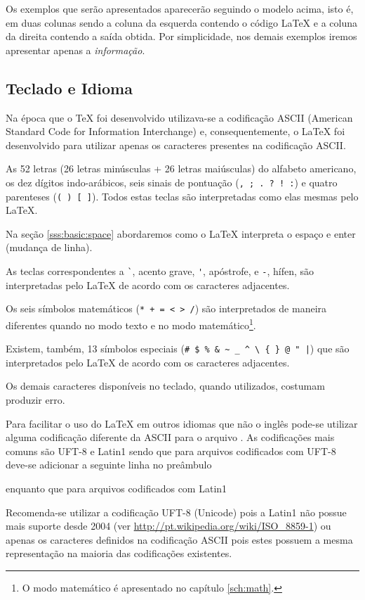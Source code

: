 Os exemplos que serão apresentados aparecerão seguindo o modelo acima, isto é, em duas colunas sendo a coluna da esquerda contendo o código LaTeX e a coluna da direita contendo a saída obtida. Por simplicidade, nos demais exemplos iremos apresentar apenas a \emph{informação}.

\subsection{Teclado e Idioma}
Na \'{e}poca que o TeX foi desenvolvido utilizava-se a codifica\c{c}\~{a}o ASCII (American Standard Code for Information Interchange) e, consequentemente, o LaTeX foi desenvolvido para utilizar apenas os caracteres presentes na codifica\c{c}\~{a}o ASCII.

As 52 letras (26 letras minúsculas + 26 letras maiúsculas) do alfabeto americano, os dez dígitos indo-arábicos, seis sinais de pontuação (\lstinline+, ; . ? ! :+) e quatro parenteses (\lstinline!( ) [ ]!). Todos estas teclas são interpretadas como elas mesmas pelo LaTeX.

Na seção \ref{sss:basic:space} abordaremos como o LaTeX interpreta o espaço e enter (mudança de linha).

As teclas correspondentes a \lstinline!`!, acento grave, \lstinline!'!, apóstrofe, e \lstinline!-!, hífen, são interpretadas pelo LaTeX de acordo com os caracteres adjacentes.

Os seis símbolos matemáticos (\lstinline!* + = < > /!) são interpretados de maneira diferentes quando no modo texto e no modo matemático\footnote{O modo matemático é apresentado no capítulo \ref{sch:math}.}.

Existem, também, 13 símbolos especiais (\lstinline!# $ % & ~ _ ^ \ { } @ " |!) que são interpretados pelo LaTeX de acordo com os caracteres adjacentes.

Os demais caracteres disponíveis no teclado, quando utilizados, costumam produzir erro.

Para facilitar o uso do LaTeX em outros idiomas que n\~{a}o o ingl\^{e}s pode-se utilizar alguma codificação diferente da ASCII para o arquivo . As codificações mais comuns são UFT-8 e Latin1 sendo que para arquivos codificados com UFT-8 deve-se adicionar a seguinte linha no preâmbulo
\begin{code}
\usepackage[utf8]{inputenc}
\end{code}
enquanto que para arquivos codificados com Latin1
\begin{code}
\usepackage[latin1]{inputenc}
\end{code}
Recomenda-se utilizar a codifica\c{c}\~{a}o UFT-8 (Unicode) pois a Latin1 n\~{a}o possue mais suporte desde 2004 (ver \url{http://pt.wikipedia.org/wiki/ISO_8859-1}) ou apenas os caracteres definidos na codifica\c{c}\~{a}o ASCII pois estes possuem a mesma representa\c{c}\~{a}o na maioria das codifica\c{c}\~{o}es existentes.

